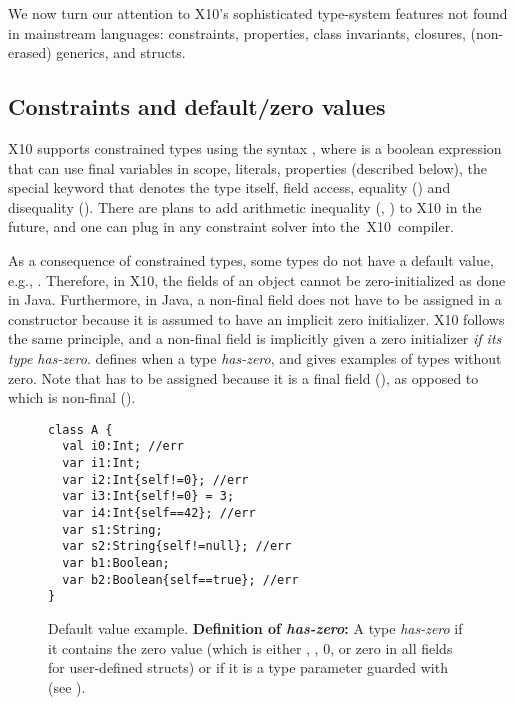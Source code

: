 We now turn our attention to X10's sophisticated type-system
    features not found in mainstream languages:
    constraints, properties, class invariants, closures, (non-erased) generics, and structs.

\subsection{Constraints and default/zero values}
X10 supports constrained types using the syntax ,
    where  is a boolean expression that can use final variables in scope,
    literals, properties (described below),
    the special keyword 
    that denotes the type itself,
    field access, equality (\code{==}) and disequality (\code{!=}).
There are plans to add arithmetic inequality (\code{<}, \code{<=})
    to X10 in the future,
    and one can plug in any constraint solver into the~X10~compiler.

As a consequence of constrained types,
    some types do not have a default value, e.g., .
Therefore, in X10, the fields of an object cannot be zero-initialized as done in Java.
Furthermore, in Java, a non-final field does not have to be assigned in a constructor
    because it is assumed to have an implicit zero initializer.
X10 follows the same principle, and a non-final field is implicitly given a zero initializer
    \emph{if its type has-zero}.
 defines when a type \emph{has-zero},
    and gives examples of types without zero.
Note that  has to be assigned because it is a final field (),
    as opposed to  which is non-final ().

\begin{figure}
\vspace{-0.2cm}\begin{lstlisting}
class A {
  val i0:Int; //err
  var i1:Int;
  var i2:Int{self!=0}; //err
  var i3:Int{self!=0} = 3;
  var i4:Int{self==42}; //err
  var s1:String;
  var s2:String{self!=null}; //err
  var b1:Boolean;
  var b2:Boolean{self==true}; //err
}
\end{lstlisting}\vspace{-0.2cm}
\caption{Default value example.
    \textbf{Definition of \emph{has-zero}:}
        {A type \emph{has-zero} if it contains the zero value
            (which is either , , 0, or
                zero in all fields for user-defined structs)
            or if it is a type parameter guarded with  (see ).}
    }
\label{Figure:Constraints}
\end{figure}


